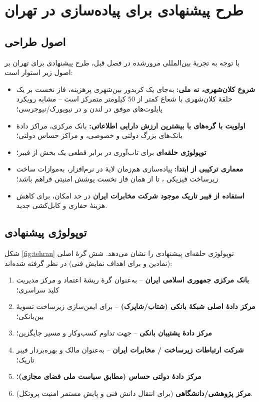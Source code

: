 \chapter{طرح پیشنهادی برای پیاده‌سازی در تهران}
\label{chap:tehran}

\section{اصول طراحی}

با توجه به تجربهٔ بین‌المللی مرورشده در فصل قبل، طرح پیشنهادی برای تهران بر اصول زیر استوار است:

\begin{itemize}
\item \textbf{شروع کلان‌شهری، نه ملی:} به‌جای یک کریدور بین‌شهری پرهزینه، فاز نخست بر یک حلقهٔ  کلان‌شهری با شعاع کمتر از $50$ کیلومتر متمرکز است -- مشابه رویکرد پایلوت‌های موفق  در لندن و  در نیویورک/نیوجرسی؛
\item \textbf{اولویت با گره‌های با بیشترین ارزش دارایی اطلاعاتی:} بانک مرکزی، مراکز دادهٔ بانک‌های بزرگ دولتی و خصوصی، و مراکز حساس دولتی؛
\item \textbf{توپولوژی حلقه‌ای } برای تاب‌آوری در برابر قطعی یک بخش از فیبر؛
\item \textbf{معماری ترکیبی از ابتدا:} پیاده‌سازی هم‌زمان لایهٔ  در نرم‌افزار، به‌موازات ساخت زیرساخت فیزیکی ، تا از همان فاز نخست پوشش امنیتی فراهم باشد؛
\item \textbf{استفاده از فیبر تاریک موجود شرکت مخابرات ایران} در حد امکان، برای کاهش هزینهٔ حفاری و کابل‌کشی جدید.
\end{itemize}

\section{توپولوژی پیشنهادی}

شکل \ref{fig:tehran} توپولوژی حلقه‌ای پیشنهادی را نشان می‌دهد. شش گرهٔ اصلی (نمادین و برای اهداف نمایش فنی) در نظر گرفته شده‌اند:

\begin{enumerate}
\item \textbf{بانک مرکزی جمهوری اسلامی ایران} -- به‌عنوان گرهٔ ریشهٔ اعتماد  و مرکز مدیریت کلید سراسری؛
\item \textbf{مرکز دادهٔ اصلی شبکهٔ بانکی (شتاب/شاپرک)} -- برای ایمن‌سازی زیرساخت تسویهٔ بین‌بانکی؛
\item \textbf{مرکز دادهٔ پشتیبان بانکی} -- جهت تداوم کسب‌وکار و مسیر جایگزین؛
\item \textbf{شرکت ارتباطات زیرساخت / مخابرات ایران} -- به‌عنوان مالک و بهره‌بردار فیبر تاریک؛
\item \textbf{مرکز دادهٔ دولتی حساس (مطابق سیاست ملی فضای مجازی)}؛
\item \textbf{مرکز پژوهشی/دانشگاهی} (برای انتقال دانش فنی و پایش مستمر امنیت پروتکل).
\end{enumerate}

